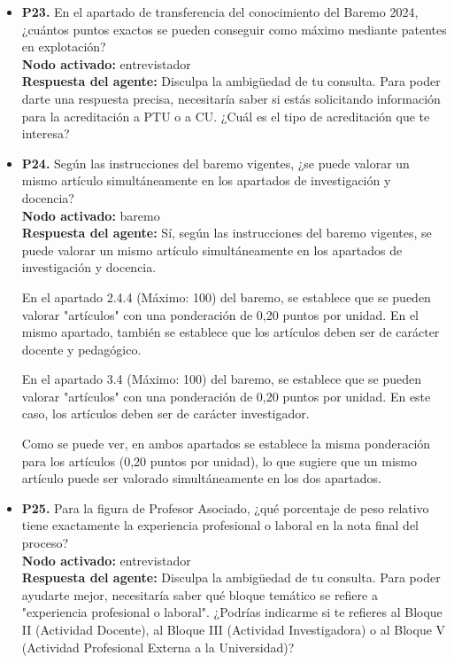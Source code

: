 \documentclass{article}
\begin{document}
\begin{itemize}
      \item \textbf{P23.} En el apartado de transferencia del conocimiento del Baremo 2024, ¿cuántos puntos exactos se pueden conseguir como máximo mediante patentes en explotación? \\
            \textbf{Nodo activado:} entrevistador \\
            \textbf{Respuesta del agente:} Disculpa la ambigüedad de tu consulta. Para poder darte una respuesta precisa, necesitaría saber si estás solicitando información para la acreditación a PTU o a CU. ¿Cuál es el tipo de acreditación que te interesa?

      \item \textbf{P24.} Según las instrucciones del baremo vigentes, ¿se puede valorar un mismo artículo simultáneamente en los apartados de investigación y docencia? \\
            \textbf{Nodo activado:} baremo \\
            \textbf{Respuesta del agente:} Sí, según las instrucciones del baremo vigentes, se puede valorar un mismo artículo simultáneamente en los apartados de investigación y docencia.

            En el apartado 2.4.4 (Máximo: 100) del baremo, se establece que se pueden valorar "artículos" con una ponderación de 0,20 puntos por unidad. En el mismo apartado, también se establece que los artículos deben ser de carácter docente y pedagógico.

            En el apartado 3.4 (Máximo: 100) del baremo, se establece que se pueden valorar "artículos" con una ponderación de 0,20 puntos por unidad. En este caso, los artículos deben ser de carácter investigador.

            Como se puede ver, en ambos apartados se establece la misma ponderación para los artículos (0,20 puntos por unidad), lo que sugiere que un mismo artículo puede ser valorado simultáneamente en los dos apartados.

      \item \textbf{P25.} Para la figura de Profesor Asociado, ¿qué porcentaje de peso relativo tiene exactamente la experiencia profesional o laboral en la nota final del proceso? \\
            \textbf{Nodo activado:} entrevistador \\
            \textbf{Respuesta del agente:} Disculpa la ambigüedad de tu consulta. Para poder ayudarte mejor, necesitaría saber qué bloque temático se refiere a "experiencia profesional o laboral". ¿Podrías indicarme si te refieres al Bloque II (Actividad Docente), al Bloque III (Actividad Investigadora) o al Bloque V (Actividad Profesional Externa a la Universidad)?


\end{itemize}
\end{document}
